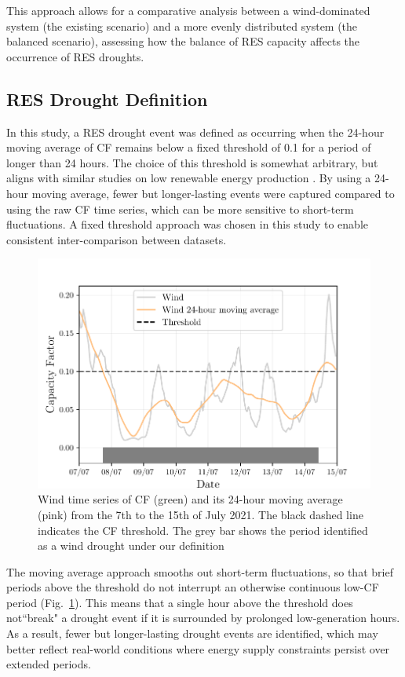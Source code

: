 \documentclass[a4paper, 11pt]{article}
\begin{document}
This approach allows for a comparative analysis between a wind-dominated system (the existing scenario) and a more evenly distributed system (the balanced scenario), assessing how the balance of RES capacity affects the occurrence of RES droughts.

\subsection{RES Drought Definition}
\label{sec:res_drought}

In this study, a RES drought event was defined as occurring when the 24-hour moving average of CF remains below a fixed threshold of 0.1 for a period of longer than 24 hours. The choice of this threshold is somewhat arbitrary, but aligns with similar studies on low renewable energy production \cite{kaspar2019drought, ohba2022drought, mayer2023drought}. By using a 24-hour moving average, fewer but longer-lasting events were captured compared to using the raw CF time series, which can be more sensitive to short-term fluctuations. A fixed threshold approach was chosen in this study to enable consistent inter-comparison between datasets.

\begin{figure}[ht!]
	\centering
	\includegraphics{droughts_methodology}
	\caption{Wind time series of CF (green) and its 24-hour moving average (pink) from the 7th to the 15th of July 2021. The black dashed line indicates the CF threshold. The grey bar shows the period identified as a wind drought under our definition}
	\label{fig:find_res_droughts}
\end{figure}

The moving average approach smooths out short-term fluctuations, so that brief periods above the threshold do not interrupt an otherwise continuous low-CF period (Fig.~\ref{fig:find_res_droughts}). This means that a single hour above the threshold does not``break" a drought event if it is surrounded by prolonged low-generation hours. As a result, fewer but longer-lasting drought events are identified, which may better reflect real-world conditions where energy supply constraints persist over extended periods.
\end{document}
